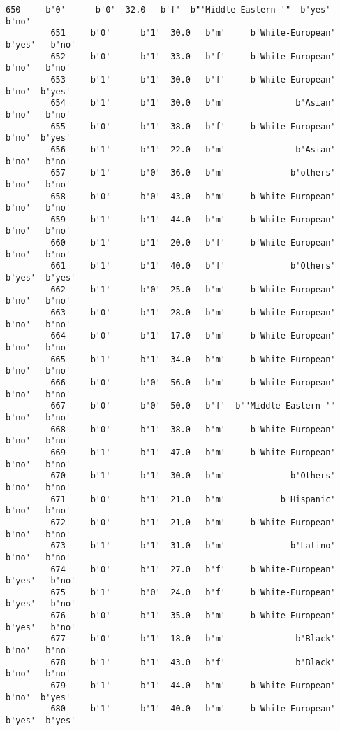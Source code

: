 \documentclass[11pt]{article}
\begin{document}
\begin{Verbatim}[commandchars=\\\{\}]
         650     b'0'      b'0'  32.0   b'f'  b"'Middle Eastern '"  b'yes'   b'no'   
         651     b'0'      b'1'  30.0   b'm'     b'White-European'  b'yes'   b'no'   
         652     b'0'      b'1'  33.0   b'f'     b'White-European'   b'no'   b'no'   
         653     b'1'      b'1'  30.0   b'f'     b'White-European'   b'no'  b'yes'   
         654     b'1'      b'1'  30.0   b'm'              b'Asian'   b'no'   b'no'   
         655     b'0'      b'1'  38.0   b'f'     b'White-European'   b'no'  b'yes'   
         656     b'1'      b'1'  22.0   b'm'              b'Asian'   b'no'   b'no'   
         657     b'1'      b'0'  36.0   b'm'             b'others'   b'no'   b'no'   
         658     b'0'      b'0'  43.0   b'm'     b'White-European'   b'no'   b'no'   
         659     b'1'      b'1'  44.0   b'm'     b'White-European'   b'no'   b'no'   
         660     b'1'      b'1'  20.0   b'f'     b'White-European'   b'no'   b'no'   
         661     b'1'      b'1'  40.0   b'f'             b'Others'  b'yes'  b'yes'   
         662     b'1'      b'0'  25.0   b'm'     b'White-European'   b'no'   b'no'   
         663     b'0'      b'1'  28.0   b'm'     b'White-European'   b'no'   b'no'   
         664     b'0'      b'1'  17.0   b'm'     b'White-European'   b'no'   b'no'   
         665     b'1'      b'1'  34.0   b'm'     b'White-European'   b'no'   b'no'   
         666     b'0'      b'0'  56.0   b'm'     b'White-European'   b'no'   b'no'   
         667     b'0'      b'0'  50.0   b'f'  b"'Middle Eastern '"   b'no'   b'no'   
         668     b'0'      b'1'  38.0   b'm'     b'White-European'   b'no'   b'no'   
         669     b'1'      b'1'  47.0   b'm'     b'White-European'   b'no'   b'no'   
         670     b'1'      b'1'  30.0   b'm'             b'Others'   b'no'   b'no'   
         671     b'0'      b'1'  21.0   b'm'           b'Hispanic'   b'no'   b'no'   
         672     b'0'      b'1'  21.0   b'm'     b'White-European'   b'no'   b'no'   
         673     b'1'      b'1'  31.0   b'm'             b'Latino'   b'no'   b'no'   
         674     b'0'      b'1'  27.0   b'f'     b'White-European'  b'yes'   b'no'   
         675     b'1'      b'0'  24.0   b'f'     b'White-European'  b'yes'   b'no'   
         676     b'0'      b'1'  35.0   b'm'     b'White-European'  b'yes'   b'no'   
         677     b'0'      b'1'  18.0   b'm'              b'Black'   b'no'   b'no'   
         678     b'1'      b'1'  43.0   b'f'              b'Black'   b'no'   b'no'   
         679     b'1'      b'1'  44.0   b'm'     b'White-European'   b'no'  b'yes'   
         680     b'1'      b'1'  40.0   b'm'     b'White-European'  b'yes'  b'yes'   

\end{Verbatim}
\end{document}
